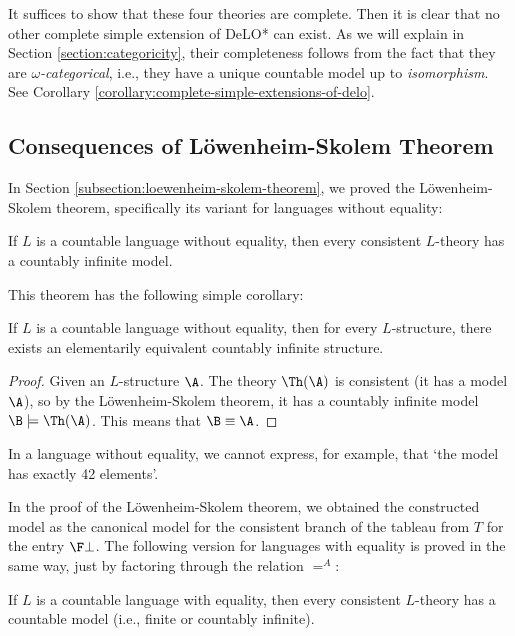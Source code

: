 It suffices to show that these four theories are complete. Then it is clear that no other complete simple extension of DeLO* can exist. As we will explain in Section \ref{section:categoricity}, their completeness follows from the fact that they are \emph{$\omega$-categorical}, i.e., they have a unique countable model up to \emph{isomorphism}. See Corollary \ref{corollary:complete-simple-extensions-of-delo}.

\subsection{Consequences of Löwenheim-Skolem Theorem}

In Section \ref{subsection:loewenheim-skolem-theorem}, we proved the Löwenheim-Skolem theorem, specifically its variant for languages without equality:

\begin{theorem-unnumbered}
    If $L$ is a countable language without equality, then every consistent $L$-theory has a countably infinite model.
\end{theorem-unnumbered}

This theorem has the following simple corollary:

\begin{corollary}\label{corollary:loewenheim-skolem-without-equality}
    If $L$ is a countable language without equality, then for every $L$-structure, there exists an elementarily equivalent countably infinite structure.
\end{corollary}
\begin{proof}
    Given an $L$-structure $\A$. The theory $\Th(\A)$ is consistent (it has a model $\A$), so by the Löwenheim-Skolem theorem, it has a countably infinite model $\B\models\Th(\A)$. This means that $\B\equiv\A$.
\end{proof}

In a language without equality, we cannot express, for example, that `the model has exactly 42 elements'.

In the proof of the Löwenheim-Skolem theorem, we obtained the constructed model as the canonical model for the consistent branch of the tableau from $T$ for the entry $\F\bot$. The following version for languages with equality is proved in the same way, just by factoring through the relation $=^A$:

\begin{theorem-unnumbered}
    If $L$ is a countable language with equality, then every consistent $L$-theory has a countable model (i.e., finite or countably infinite).
\end{theorem-unnumbered}

